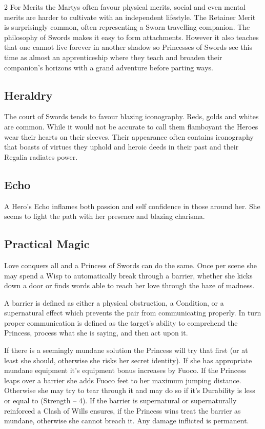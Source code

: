 \begin{multicols}{2}
For Merits the Martys often favour physical merits, social and even mental merits are harder to cultivate with an independent lifestyle. The Retainer Merit is surprisingly common, often representing a Sworn travelling companion. The philosophy of Swords makes it easy to form attachments. However it also teaches that one cannot live forever in another shadow so Princesses of Swords see this time as almost an apprenticeship where they teach  and broaden their companion's horizons with a grand adventure before parting ways.

\subsection*{Heraldry}

The court of Swords tends to favour blazing iconography. Reds, golds and whites are common. While it would not be accurate to call them flamboyant the Heroes wear their hearts on their sleeves. Their appearance often contains iconography that boasts of virtues they uphold and heroic deeds in their past and their Regalia radiates power. 

\subsection*{Echo}

A Hero's Echo inflames both passion and self confidence in those around her. She seems to light the path with her presence and blazing charisma. 

\subsection*{Practical Magic}

Love conquers all and a Princess of Swords can do the same. Once per scene she may spend a Wisp to automatically break through a barrier, whether she kicks down a door or finds words able to reach her love through the haze of madness. 

A barrier is defined as either a physical obstruction, a Condition, or a supernatural effect which prevents the pair from communicating properly. In turn proper communication is defined as the target's ability to comprehend the Princess, process what she is saying, and then act upon it.

If there is a seemingly mundane solution the Princess will try that first (or at least she should, otherwise she risks her secret identity). If she has appropriate mundane equipment it's equipment bonus increases by Fuoco. If the Princess leaps over a barrier she adds Fuoco feet to her maximum jumping distance. Otherwise she may try to tear through it and may do so if it's Durability is less or equal to (Strength – 4). If the barrier is supernatural or supernaturally reinforced a Clash of Wills ensures, if the Princess wins treat the barrier as mundane, otherwise she cannot breach it. Any damage inflicted is permanent.


\end{multicols}
